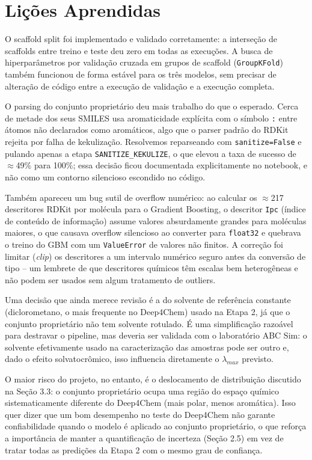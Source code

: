 \documentclass[12pt]{article}
\begin{document}
\section{Lições Aprendidas}

O scaffold split foi implementado e validado corretamente: a interseção de scaffolds entre treino e teste deu zero em todas as execuções. A busca de hiperparâmetros por validação cruzada em grupos de scaffold (\texttt{GroupKFold}) também funcionou de forma estável para os três modelos, sem precisar de alteração de código entre a execução de validação e a execução completa.

O parsing do conjunto proprietário deu mais trabalho do que o esperado. Cerca de metade dos seus SMILES usa aromaticidade explícita com o símbolo \texttt{:} entre átomos não declarados como aromáticos, algo que o parser padrão do RDKit rejeita por falha de kekulização. Resolvemos reparseando com \texttt{sanitize=False} e pulando apenas a etapa \texttt{SANITIZE\_KEKULIZE}, o que elevou a taxa de sucesso de $\approx$49\% para 100\%; essa decisão ficou documentada explicitamente no notebook, e não como um contorno silencioso escondido no código.

Também apareceu um bug sutil de overflow numérico: ao calcular os $\approx$217 descritores RDKit por molécula para o Gradient Boosting, o descritor \texttt{Ipc} (índice de conteúdo de informação) assume valores absurdamente grandes para moléculas maiores, o que causava overflow silencioso ao converter para \texttt{float32} e quebrava o treino do GBM com um \texttt{ValueError} de valores não finitos. A correção foi limitar (\textit{clip}) os descritores a um intervalo numérico seguro antes da conversão de tipo -- um lembrete de que descritores químicos têm escalas bem heterogêneas e não podem ser usados sem algum tratamento de outliers.

Uma decisão que ainda merece revisão é a do solvente de referência constante (diclorometano, o mais frequente no Deep4Chem) usado na Etapa 2, já que o conjunto proprietário não tem solvente rotulado. É uma simplificação razoável para destravar o pipeline, mas deveria ser validada com o laboratório ABC Sim: o solvente efetivamente usado na caracterização das amostras pode ser outro e, dado o efeito solvatocrômico, isso influencia diretamente o $\lambda_{max}$ previsto.

O maior risco do projeto, no entanto, é o deslocamento de distribuição discutido na Seção 3.3: o conjunto proprietário ocupa uma região do espaço químico sistematicamente diferente do Deep4Chem (mais polar, menos aromática). Isso quer dizer que um bom desempenho no teste do Deep4Chem não garante confiabilidade quando o modelo é aplicado ao conjunto proprietário, o que reforça a importância de manter a quantificação de incerteza (Seção 2.5) em vez de tratar todas as predições da Etapa 2 com o mesmo grau de confiança.
\end{document}
